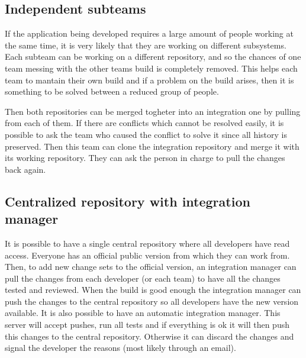 

\subsection{Independent subteams}
If the application being developed requires a large amount of people working at the same time, it is very likely that they are working on different subsystems. Each subteam can be working on a different repository, and so the chances of one team messing with the other teams build is completely removed. This helps each team to mantain their own build and if a problem on the build arises, then it is something to be solved between a reduced group of people.

Then both repositories can be merged togheter into an integration one by pulling from each of them. If there are conflicts which cannot be resolved easily, it is possible to ask the team who caused the conflict to solve it since all history is preserved. Then this team can clone the integration repository and merge it with its working repository. They can ask the person in charge to pull the changes back again.



\subsection{Centralized repository with integration manager}
It is possible to have a single central repository where all developers have read access. Everyone has an official public version from which they can work from. Then, to add new change sets to the official version, an integration manager can pull the changes from each developer (or each team) to have all the changes tested and reviewed. When the build is good enough the integration manager can push the changes to the central repository so all developers have the new version available.
It is also possible to have an automatic integration manager. This server will accept pushes, run all tests and if everything is ok it will then push this changes to the central repository. Otherwise it can discard the changes and signal the developer the reasons (most likely through an email).




